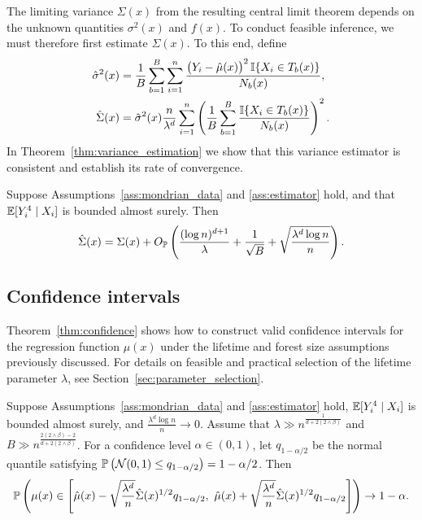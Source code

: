 The limiting variance $\Sigma(x)$ from the resulting central limit theorem
depends on the unknown quantities $\sigma^2(x)$ and $f(x)$.
To conduct feasible inference, we must therefore first estimate
$\Sigma(x)$. To this end, define
%
\begin{align}
  \label{eq:sigma2_hat}
  \hat\sigma^2(x)
  &=
  \frac{1}{B}
  \sum_{b=1}^{B}
  \sum_{i=1}^n
  \frac{\big(Y_i - \hat \mu(x)\big)^2 \, \I\{X_i \in T_b(x)\}}
  {N_b(x)}, \\
  \nonumber
  \hat\Sigma(x)
  &=
  \hat\sigma^2(x)
  \frac{n}{\lambda^d}
  \sum_{i=1}^n
  \left(
    \frac{1}{B}
    \sum_{b=1}^B
    \frac{\I\{X_i \in T_b(x)\}}{N_b(x)}
  \right)^2.
\end{align}
%
In Theorem~\ref{thm:variance_estimation} we show that this variance
estimator is consistent and establish its rate of convergence.
%
\begin{theorem}%
  \label{thm:variance_estimation}
  Suppose Assumptions~\ref{ass:mondrian_data}
  and \ref{ass:estimator} hold, and that
  $\E[Y_i^4 \mid X_i ]$ is bounded almost surely.
  Then
  \begin{align*}
    \hat\Sigma(x)
    = \Sigma(x)
    + O_\P \left(
      \frac{(\log n)^{d+1}}{\lambda}
      + \frac{1}{\sqrt B}
      + \sqrt{\frac{\lambda^d \log n}{n}}
    \right).
  \end{align*}

\end{theorem}

\subsection{Confidence intervals}

Theorem~\ref{thm:confidence} shows how to construct valid confidence
intervals for the regression function $\mu(x)$ under the
lifetime and forest size assumptions previously discussed.
For details on feasible and practical selection of
the lifetime parameter $\lambda$,
see Section~\ref{sec:parameter_selection}.
%
\begin{theorem}%
  \label{thm:confidence}
  Suppose Assumptions~\ref{ass:mondrian_data} and \ref{ass:estimator} hold,
  $\E[Y_i^4 \mid X_i ]$ is bounded almost surely,
  and $\frac{\lambda^d \log n}{n} \to 0$.
  Assume that
  $\lambda \gg n^{\frac{1}{d + 2(2 \wedge \beta)}}$
  and $B \gg n^{\frac{2 (2 \wedge \beta) - 2}{d + 2 (2 \wedge \beta)}}$.
  For a confidence level $\alpha \in (0, 1)$,
  let $q_{1 - \alpha / 2}$ be the normal quantile satisfying
  $\P \left( \cN(0, 1) \leq q_{1 - \alpha / 2} \right) = 1 - \alpha / 2$.
  Then
  \begin{align*}
    \P \left(
      \mu(x) \in
      \left[
        \hat \mu(x)
        - \sqrt{\frac{\lambda^d}{n}} \hat \Sigma(x)^{1/2}
        q_{1 - \alpha / 2}, \
        \hat \mu(x)
        + \sqrt{\frac{\lambda^d}{n}} \hat \Sigma(x)^{1/2}
        q_{1 - \alpha / 2}
      \right]
    \right)
    \to
    1 - \alpha.
  \end{align*}

\end{theorem}


